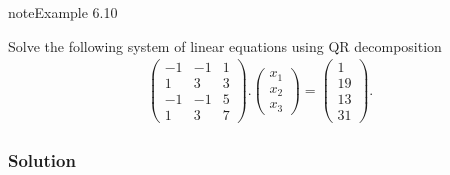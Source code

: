 \documentclass[letterpaper,10pt,english]{jupyterBook}
\begin{document}
\begin{sphinxadmonition}{note}{Example 6.10}

\sphinxAtStartPar
Solve the following system of linear equations using QR decomposition
\begin{align*}
    \begin{pmatrix}
        -1 & -1 & 1\\
        1 & 3 & 3\\
        -1 & -1 & 5\\
        1 & 3 & 7
    \end{pmatrix}.
    \begin{pmatrix} x_1 \\ x_2 \\ x_3 \end{pmatrix} =
    \begin{pmatrix} 1 \\ 19 \\ 13 \\ 31 \end{pmatrix}.
\end{align*}\subsubsection*{Solution}


\end{sphinxadmonition}
\end{document}
